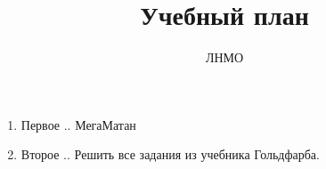 \documentclass[12pt,a4paper]{article}
\author{ЛНМО}
\title{Учебный план}
\date{}
\begin{document}
 	\maketitle
 	\begin{enumerate}
 		\item \large{Первое .. МегаМатан}
 		\item \large{Второе .. Решить все задания из учебника Гольдфарба.}
 	\end{enumerate}
 
\end{document}
